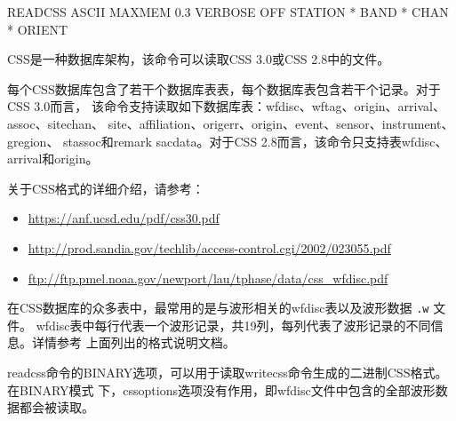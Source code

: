 \begin{SACSTX}
READCSS ASCII MAXMEM 0.3 VERBOSE OFF STATION * BAND * CHAN * ORIENT
\end{SACSTX}

CSS是一种数据库架构，该命令可以读取CSS 3.0或CSS 2.8中的文件。

每个CSS数据库包含了若干个数据库表表，每个数据库表包含若干个记录。对于CSS 3.0而言，
该命令支持读取如下数据库表：wfdisc、wftag、origin、arrival、assoc、sitechan、
site、affiliation、origerr、origin、event、sensor、instrument、gregion、
stassoc和remark sacdata。对于CSS 2.8而言，该命令只支持表wfdisc、arrival和origin。

关于CSS格式的详细介绍，请参考：
\begin{itemize}
\item \url{https://anf.ucsd.edu/pdf/css30.pdf}
\item \url{http://prod.sandia.gov/techlib/access-control.cgi/2002/023055.pdf}
\item \url{ftp://ftp.pmel.noaa.gov/newport/lau/tphase/data/css_wfdisc.pdf}
\end{itemize}

在CSS数据库的众多表中，最常用的是与波形相关的wfdisc表以及波形数据 \texttt{.w} 文件。
wfdisc表中每行代表一个波形记录，共19列，每列代表了波形记录的不同信息。详情参考
上面列出的格式说明文档。

readcss命令的BINARY选项，可以用于读取writecss命令生成的二进制CSS格式。在BINARY模式
下，cssoptions选项没有作用，即wfdisc文件中包含的全部波形数据都会被读取。

